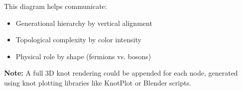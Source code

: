 This diagram helps communicate:
\begin{itemize}
    \item Generational hierarchy by vertical alignment
    \item Topological complexity by color intensity
    \item Physical role by shape (fermions vs. bosons)
\end{itemize}

\textbf{Note:} A full 3D knot rendering could be appended for each node, generated using knot plotting libraries like KnotPlot or Blender scripts.